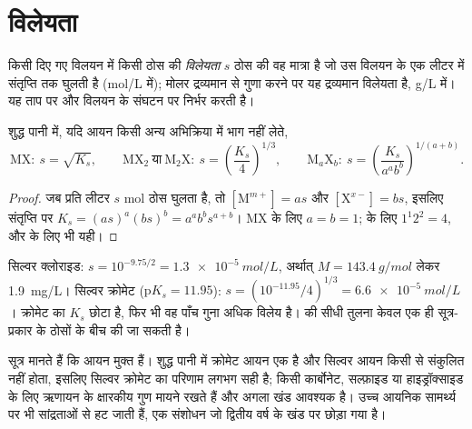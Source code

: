 \section{विलेयता}

\begin{definition}[विलेयता]\label{def:b1:precipitation:solubility}
किसी दिए गए विलयन में किसी ठोस की \emph{विलेयता} $s$
ठोस की वह मात्रा है जो उस विलयन के एक लीटर में संतृप्ति तक
घुलती है (\unit{mol/L} में); मोलर द्रव्यमान से गुणा करने पर यह
द्रव्यमान विलेयता है, \unit{g/L} में। यह ताप पर और
विलयन के संघटन पर निर्भर करती है।
\end{definition}

\begin{proposition}[विलेयता गुणनफल से विलेयता]\label{prop:b1:precipitation:s-of-ks}
शुद्ध पानी में, यदि आयन किसी अन्य अभिक्रिया में भाग नहीं लेते,
\[
  \mathrm{MX}:\ s = \sqrt{K_s}, \qquad
  \mathrm{MX_2}\ \text{या}\ \mathrm{M_2X}:\ s = \left(\frac{K_s}{4}\right)^{1/3},
  \qquad
  \mathrm{M}_a\mathrm{X}_b:\ s = \left(\frac{K_s}{a^a b^b}\right)^{1/(a+b)} .
\]
\end{proposition}

\begin{proof}
जब प्रति लीटर $s$ mol ठोस घुलता है, तो $[\mathrm{M}^{m+}] = as$ और
$[\mathrm{X}^{x-}] = bs$, इसलिए संतृप्ति पर $K_s = (as)^a(bs)^b =
a^a b^b s^{a+b}$। MX के लिए $a = b = 1$;  के लिए $1^1 2^2 = 4$, और
 के लिए भी यही।
\end{proof}

\begin{example}[सिल्वर क्लोराइड और सिल्वर क्रोमेट]\label{ex:b1:precipitation:agcl-ag2cro4}
सिल्वर क्लोराइड: $s = 10^{-9.75/2} = \qty{1.3e-5}{mol/L}$, अर्थात्
$M = \qty{143.4}{g/mol}$ लेकर \qty{1.9}{mg/L}। सिल्वर क्रोमेट 
($\mathrm{p}K_s = 11.95$): $s = (10^{-11.95}/4)^{1/3} =
\qty{6.6e-5}{mol/L}$। क्रोमेट का $K_s$ छोटा है, फिर भी वह पाँच
गुना अधिक विलेय है।  की सीधी तुलना केवल
एक ही सूत्र-प्रकार के ठोसों के बीच की जा सकती है।
\end{example}

\begin{remark}
सूत्र मानते हैं कि आयन मुक्त हैं। शुद्ध पानी में क्रोमेट
आयन एक  है और सिल्वर आयन किसी से संकुलित नहीं होता, इसलिए
सिल्वर क्रोमेट का परिणाम लगभग सही है; किसी कार्बोनेट,
सल्फ़ाइड या हाइड्रॉक्साइड के लिए ऋणायन के क्षारकीय गुण मायने रखते हैं और
अगला खंड आवश्यक है। उच्च आयनिक सामर्थ्य पर  भी सांद्रताओं से
हट जाती हैं, एक संशोधन जो द्वितीय वर्ष के खंड पर छोड़ा गया है।
\end{remark}

